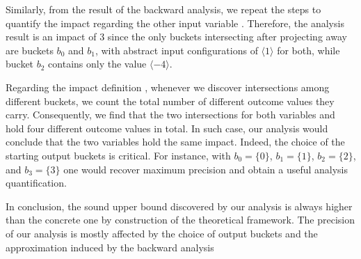Similarly, from the result of the backward analysis, we repeat the steps to quantify the impact regarding the other input variable \y{}.
Therefore, the analysis result is an impact of 3 since the only buckets intersecting after projecting away \y{} are buckets $b_0$ and $b_1$, with abstract input configurations of $\langle 1\rangle$ for both, while bucket $b_2$ contains only the value $\langle -4\rangle$.

Regarding the impact definition \outcomesname, whenever we discover intersections among different buckets, we count the total number of different outcome values they carry.
Consequently, we find that the two intersections for both variables \x{} and \y{} hold four different outcome values in total.
In such case, our analysis would conclude that the two variables hold the same impact.
Indeed, the choice of the starting output buckets is critical.
For instance, with $b_0=\{0\}$, $b_1=\{1\}$, $b_2=\{2\}$, and $b_3=\{3\}$ one would recover maximum precision and obtain a useful analysis quantification.

In conclusion, the sound upper bound discovered by our analysis is always higher than the concrete one by construction of the theoretical framework.
The precision of our analysis is mostly affected by the choice of output buckets and the approximation induced by the backward analysis 




